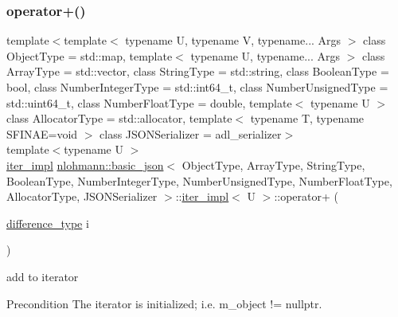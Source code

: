 \subsubsection{\texorpdfstring{operator+()}{operator+()}}
{\footnotesize\ttfamily template$<$template$<$ typename U, typename V, typename... Args $>$ class Object\+Type = std\+::map, template$<$ typename U, typename... Args $>$ class Array\+Type = std\+::vector, class String\+Type  = std\+::string, class Boolean\+Type  = bool, class Number\+Integer\+Type  = std\+::int64\+\_\+t, class Number\+Unsigned\+Type  = std\+::uint64\+\_\+t, class Number\+Float\+Type  = double, template$<$ typename U $>$ class Allocator\+Type = std\+::allocator, template$<$ typename T, typename S\+F\+I\+N\+A\+E=void $>$ class J\+S\+O\+N\+Serializer = adl\+\_\+serializer$>$ \\
template$<$typename U $>$ \\
\mbox{\hyperlink{classnlohmann_1_1basic__json_1_1iter__impl}{iter\+\_\+impl}} \mbox{\hyperlink{classnlohmann_1_1basic__json}{nlohmann\+::basic\+\_\+json}}$<$ Object\+Type, Array\+Type, String\+Type, Boolean\+Type, Number\+Integer\+Type, Number\+Unsigned\+Type, Number\+Float\+Type, Allocator\+Type, J\+S\+O\+N\+Serializer $>$\+::\mbox{\hyperlink{classnlohmann_1_1basic__json_1_1iter__impl}{iter\+\_\+impl}}$<$ U $>$\+::operator+ (\begin{DoxyParamCaption}\item[{\mbox{\hyperlink{classnlohmann_1_1basic__json_1_1iter__impl_aa3d908ee643e5938d32e5f6d261d7715}{difference\+\_\+type}}}]{i }\end{DoxyParamCaption})\hspace{0.3cm}{\ttfamily [inline]}}



add to iterator 

\begin{DoxyPrecond}{Precondition}
The iterator is initialized; i.\+e. {\ttfamily m\+\_\+object != nullptr}. 
\end{DoxyPrecond}
\mbox{\label{classnlohmann_1_1basic__json_1_1iter__impl_a74e26f187519bc7181b825b8f38a4e93}} 
